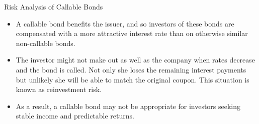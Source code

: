 \documentclass{beamer}
\begin{document}

\begin{frame}{Risk Analysis of Callable Bonds}
	\begin{itemize}
		\item A callable bond benefits the issuer, and so investors of these bonds are compensated with a more attractive interest rate than on otherwise similar non-callable bonds.
		\item<1-> The investor might not make out as well as the company when rates decrease and the bond is called. Not only she loses the remaining interest payments but unlikely she will be able to match the original coupon.
		\textcolor{maincolor}{This situation is known as reinvestment risk}.
		
		\item<2-> As a result, a callable bond may not be appropriate for investors seeking stable income and predictable returns.
	\end{itemize}
\end{frame}
\end{document}
